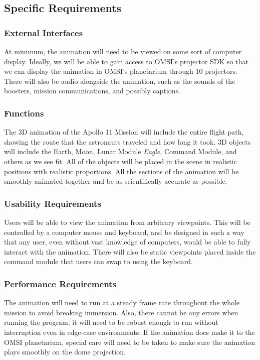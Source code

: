 \documentclass[onecolumn, draftclsnofoot,10pt, compsoc]{IEEEtran}
\begin{document}
\subsection{Specific Requirements}
    \subsubsection{External Interfaces}
    At minimum, the animation will need to be viewed on some sort of computer display. Ideally, we will be able to gain access to OMSI's projector SDK so that we can display the animation in OMSI's planetarium through 10 projectors. There will also be audio alongside the animation, such as the sounds of the boosters, mission communications, and possibly captions.
    \subsubsection{Functions}
    The 3D animation of the Apollo 11 Mission will include the entire flight path, showing the route that the astronauts traveled and how long it took. 3D objects will include the Earth, Moon, Lunar Module \textit{Eagle}, Command Module, and others as we see fit. All of the objects will be placed in the scene in realistic positions with realistic proportions. All the sections of the animation will be smoothly animated together and be as scientifically accurate as possible.
    \subsubsection{Usability Requirements}
    Users will be able to view the animation from arbitrary viewpoints. This will be controlled by a computer mouse and keyboard, and be designed in such a way that any user, even without vast knowledge of computers, would be able to fully interact with the animation. There will also be static viewpoints placed inside the command module that users can swap to using the keyboard. 
    \subsubsection{Performance Requirements}
    The animation will need to run at a steady frame rate throughout the whole mission to avoid breaking immersion. Also, there cannot be any errors when running the program; it will need to be robust enough to run without interruption even in edge-case environments. If the animation does make it to the OMSI planetarium, special care will need to be taken to make sure the animation plays smoothly on the dome projection. 
\end{document}
